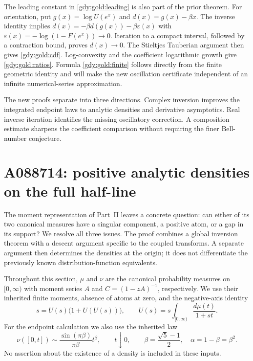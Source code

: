 \documentclass[11pt]{article}
\numberwithin{equation}{section}
\theoremstyle{definition}
\theoremstyle{remark}
\begin{document}
The leading constant in \eqref{gdy:gold:leading} is also part of the prior
theorem. For orientation, put $g(x)=\log U(e^x)$ and
$d(x)=g(x)-\beta x$. The inverse identity implies
$d(x)=-\beta d(g(x))-\beta\varepsilon(x)$ with
$\varepsilon(x)=-\log(1-F(e^x))\to0$. Iteration to a compact interval,
followed by a contraction bound, proves $d(x)\to0$.
The Stieltjes Tauberian argument then gives \eqref{gdy:gold:cdf}.
Log-convexity and the coefficient logarithmic growth give
\eqref{gdy:gold:ratios}. Formula \eqref{gdy:gold:finite} follows directly from
the finite geometric identity and will make the new oscillation certificate
independent of an infinite numerical-series approximation.

The new proofs separate into three directions. Complex inversion improves
the integrated endpoint laws to analytic densities and derivative
asymptotics. Real inverse iteration identifies the missing oscillatory
correction. A composition estimate sharpens the coefficient comparison
without requiring the finer Bell-number conjecture.



\section{A088714: positive analytic densities on the full half-line}
\label{gdy:reg:section}

The moment representation of Part~II leaves a concrete question:
can either of its two canonical measures have a singular component,
a positive atom, or a gap in its support?  We resolve all three issues.
The proof combines a global inversion theorem with a descent argument
specific to the coupled transforms.  A separate argument then determines
the densities at the origin; it does not differentiate the previously
known distribution-function equivalents.

Throughout this section, $\mu$ and $\nu$ are the canonical probability
measures on $[0,\infty)$ with moment series $A$ and
$C=(1-zA)^{-1}$, respectively.  We use their inherited finite moments,
absence of atoms at zero, and the negative-axis identity
\begin{equation}\label{gdy:reg:eq:inheritedU}
 s=U(s)\bigl(1+U(U(s))\bigr),\qquad
 U(s)=s\int_{[0,\infty)}\frac{d\mu(t)}{1+st}.
\end{equation}
For the endpoint calculation we also use the inherited law
\begin{equation}\label{gdy:reg:eq:inheritedCDF}
 \nu([0,t])\sim\frac{\sin(\pi\beta)}{\pi\beta}t^\beta,
 \qquad t\downarrow0,
 \qquad
 \beta=\frac{\sqrt5-1}{2},\quad
 \alpha=1-\beta=\beta^2.
\end{equation}
No assertion about the existence of a density is included in these
inputs.
\end{document}
